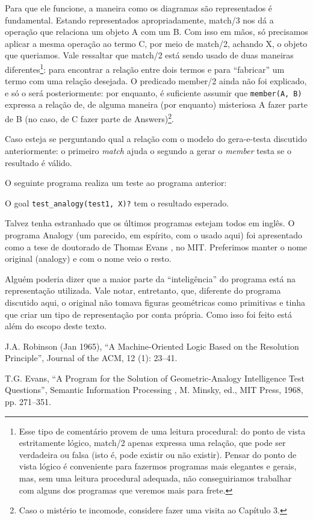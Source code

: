 \documentclass{article}
\theoremstyle{remark}
\theoremstyle{theorem}
\begin{document}
Para que ele funcione, a maneira como os diagramas são representados é fundamental. Estando representados apropriadamente, match/3 nos dá a operação que relaciona um objeto A com um B. Com isso em mãos, só precisamos aplicar a mesma operação ao termo C, por meio de match/2, achando X, o objeto que queriamos. Vale ressaltar que match/2 está sendo usado de duas maneiras diferentes\footnote{Esse tipo de comentário provem de uma leitura procedural: do ponto de
  vista estritamente lógico, match/2 apenas expressa uma relação, que pode ser verdadeira ou falsa (isto é, pode existir ou não existir). Pensar do ponto de vista lógico é conveniente para fazermos programas mais elegantes e gerais, mas, sem uma leitura procedural adequada, não conseguiriamos trabalhar com alguns dos programas que veremos mais para frete.}: para encontrar a relação entre dois termos e para ``fabricar'' um termo com uma relação
desejada. O predicado member/2 ainda não foi explicado, e só o será posteriormente: por enquanto, é suficiente assumir que {\tt member(A, B)} expressa a relação de, de alguma maneira (por enquanto) misteriosa A fazer parte de B (no caso, de C fazer parte de Answers)\footnote{Caso o mistério te incomode, considere fazer uma visita ao Capítulo 3.}.

Caso esteja se perguntando qual a relação com o modelo do gera-e-testa discutido anteriormente: o primeiro \textit{match} ajuda o segundo a gerar o \textit{member} testa se o resultado é válido.

O seguinte programa realiza um teste ao programa anterior:



O goal {\tt test\_analogy(test1, X)?} tem o resultado esperado.

Talvez tenha estranhado que os últimos programas estejam todos em inglês. O programa Analogy (um parecido, em espírito, com o usado aqui) foi apresentado como a tese de doutorado de Thomas Evans \cite{evans}, no MIT. Preferimos manter o nome original (analogy) e com o nome veio o resto.

Alguém poderia dizer que a maior parte da ``inteligência'' do programa está na representação utilizada.
Vale notar, entretanto, que, diferente do programa discutido aqui, o original não tomava figuras geométricas como
primitivas e tinha que criar um tipo de representação por conta própria. Como isso foi feito está além do escopo deste texto.







  \begin{thebibliography}{1}

    J.A. Robinson (Jan 1965), ``A Machine-Oriented Logic Based on the Resolution Principle'', Journal of the ACM, 12 (1): 23–41.

    T.G. Evans, “A Program for the Solution of Geometric-Analogy Intelligence Test Questions”, Semantic Information Processing , M. Minsky, ed., MIT Press, 1968, pp. 271–351.

  \end{thebibliography}
\end{document}

